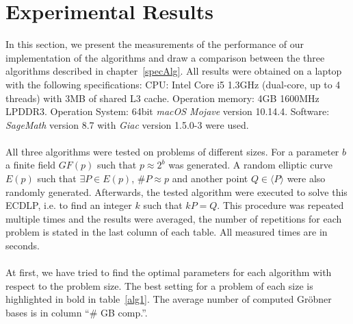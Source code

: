 \documentclass[thesis=M,english]{FITthesis}[2012/10/20]
\theoremstyle{remark}
\theoremstyle{definition}
\begin{document}
\section{Experimental Results}
\label{expResults}
In this section, we present the measurements of the performance of our implementation of the algorithms and draw a comparison between the three algorithms described in chapter~\ref{specAlg}. All results were obtained on a laptop with the following specifications:  CPU: Intel Core i5 1.3GHz (dual-core, up to 4 threads) with 3MB of shared L3 cache. Operation memory: 4GB 1600MHz LPDDR3. Operation System: 64bit \textit{macOS Mojave} version 10.14.4. Software: \textit{SageMath} version 8.7 with \textit{Giac} version 1.5.0-3 were used. 
\\ \\
\noindent All three algorithms were tested on problems of different sizes. For a parameter $b$ a finite field $GF(p)$ such that $p \approx 2^b$ was generated. A random elliptic curve $E(p)$ such that $\exists P \in E(p)$, $\#P \approx p$ and another point $Q \in \langle P \rangle$ were also randomly generated. Afterwards, the tested algorithm were executed to solve this ECDLP, i.e. to find an integer $k$ such that $kP = Q$. This procedure was repeated multiple times and the results were averaged, the number of repetitions for each problem is stated in the last column of each table. All measured times are in seconds. \\ \\ 
\noindent At first, we have tried to find the optimal parameters for each algorithm with respect to the problem size. The best setting for a problem of each size is highlighted in bold in table~\ref{alg1}. The average number of computed Gröbner bases is in column \enquote{\# GB comp.}.  
\end{document}
